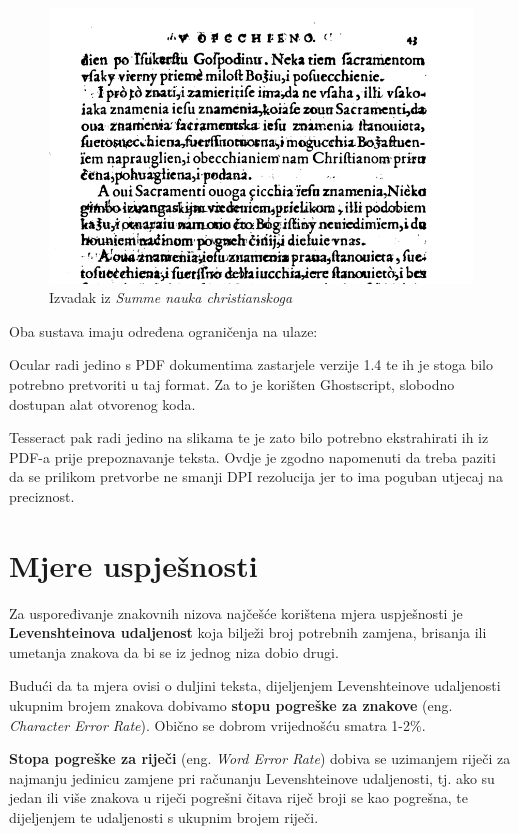 \documentclass[zavrsnirad]{fer}
\begin{document}
\begin{figure}[h!]
	\centering
	\includegraphics[width=1.0\linewidth]{Figures/summa.png} 
	\caption{Izvadak iz \textit{Summe nauka christianskoga}}
	\label{slk:summa}
\end{figure}

Oba sustava imaju određena ograničenja na ulaze: 

Ocular radi jedino s PDF dokumentima zastarjele verzije 1.4 te ih je stoga bilo potrebno pretvoriti u taj format. Za to je korišten Ghostscript, \cite{Ghostscript} slobodno dostupan alat otvorenog koda. 

Tesseract pak radi jedino na slikama te je zato bilo potrebno ekstrahirati ih iz PDF-a prije prepoznavanje teksta. Ovdje je zgodno napomenuti da treba paziti da se prilikom pretvorbe ne smanji DPI rezolucija jer to ima poguban utjecaj na preciznost.

\section{Mjere uspješnosti}

Za uspoređivanje znakovnih nizova najčešće korištena mjera uspješnosti je \textbf{Levenshteinova udaljenost} koja bilježi broj potrebnih zamjena, brisanja ili umetanja znakova da bi se iz jednog niza dobio drugi. \cite{Levenshtein1965}

Budući da ta mjera ovisi o duljini teksta, dijeljenjem Levenshteinove udaljenosti ukupnim brojem znakova dobivamo \textbf{stopu pogreške za znakove} (eng. \textit{Character Error Rate}). Obično se dobrom vrijednošću smatra 1-2\%.

\textbf{Stopa pogreške za riječi} (eng. \textit{Word Error Rate}) dobiva se uzimanjem riječi za najmanju jedinicu zamjene pri računanju Levenshteinove udaljenosti, tj. ako su jedan ili više znakova u riječi pogrešni čitava riječ broji se kao pogrešna, te dijeljenjem te udaljenosti s ukupnim brojem riječi.
\end{document}
